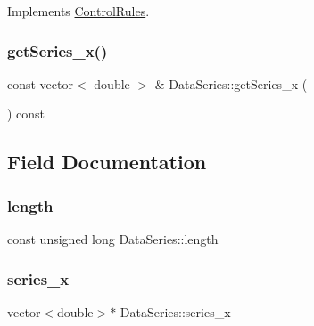 Implements \mbox{\hyperlink{classControlRules_a3d4b00d92729c6662473fc25707c0d9b_a3d4b00d92729c6662473fc25707c0d9b}{Control\+Rules}}.

\mbox{\label{classDataSeries_a0a1f6248bc7bed18587e28f307066307_a0a1f6248bc7bed18587e28f307066307}} 
\subsubsection{\texorpdfstring{get\+Series\+\_\+x()}{getSeries\_x()}}
{\footnotesize\ttfamily const vector$<$ double $>$ \& Data\+Series\+::get\+Series\+\_\+x (\begin{DoxyParamCaption}{ }\end{DoxyParamCaption}) const}



\subsection{Field Documentation}
\mbox{\label{classDataSeries_ad4a99b265519d2f57b787c03f2cf2f83_ad4a99b265519d2f57b787c03f2cf2f83}} 
\subsubsection{\texorpdfstring{length}{length}}
{\footnotesize\ttfamily const unsigned long Data\+Series\+::length}

\mbox{\label{classDataSeries_ac49042cab004e46a8183cc10183fbfcd_ac49042cab004e46a8183cc10183fbfcd}} 
\subsubsection{\texorpdfstring{series\+\_\+x}{series\_x}}
{\footnotesize\ttfamily vector$<$double$>$$\ast$ Data\+Series\+::series\+\_\+x\hspace{0.3cm}{\ttfamily [private]}}

